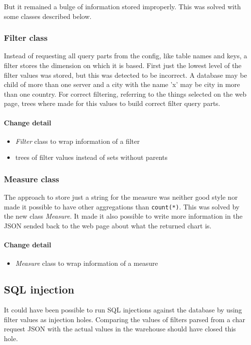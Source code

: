 But it remained a bulge of information stored improperly. This was
solved with some classes described below.

\subsubsection{Filter class}
Instead of requesting all query parts from the config, like table names and keys,
a filter stores the dimension on which it is based. First just the lowest
level of the filter values was stored, but this was detected to be incorrect.
A database may be child of more than one server and a city with the name 'x'
may be city in more than one country. For correct filtering, referring
to the things selected on the web page, trees where made for this values 
to build correct filter query parts.

\paragraph{Change detail}
\begin{itemize}
  \item \textit{Filter} class to wrap information of a filter
  \item trees of filter values instead of sets without parents
\end{itemize}


\subsubsection{Measure class}
The approach to store just a string for the measure was neither good style
nor made it possible to have other aggregations than \texttt{count(*)}.
This was solved by the new class \textit{Measure}. It made it also possible
to write more information in the JSON sended back to the web page about what
the returned chart is.

\paragraph{Change detail}
\begin{itemize}
  \item \textit{Measure} class to wrap information of a measure
\end{itemize}

\subsection{SQL injection}
It could have been possible to run SQL injections against the database
by using filter values as injection holes. Comparing the values of filters
parsed from a char request JSON with the actual values in the warehouse
should have closed this hole.

